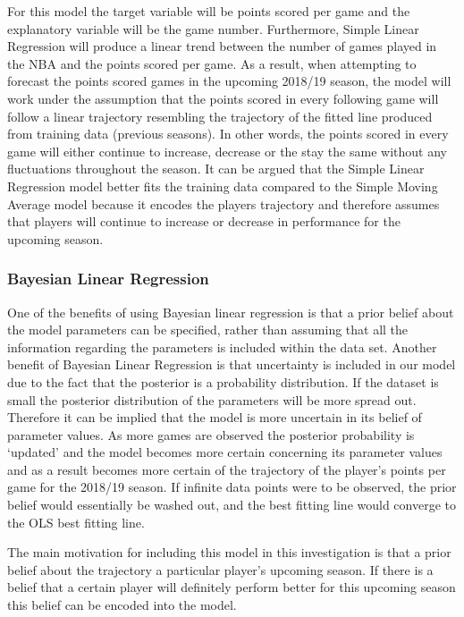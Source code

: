 \documentclass[a4paper,11pt,twoside]{article}
\begin{document}
For this model the target variable will be points scored per game and the explanatory variable will be the game number. Furthermore, Simple Linear Regression will produce a linear trend between the number of games played in the NBA and the points scored per game. As a result, when attempting to forecast the points scored games in the upcoming 2018/19 season, the model will work under the assumption that the points scored in every following game will follow a linear trajectory resembling the trajectory of the fitted line produced from training data (previous seasons). In other words, the points scored in every game will either continue to increase, decrease or the stay the same without any fluctuations throughout the season. It can be argued that the Simple Linear Regression model better fits the training data compared to the Simple Moving Average model because it encodes the players trajectory and therefore assumes that players will continue to increase or decrease in performance for the upcoming season.


\subsubsection{Bayesian Linear Regression}
One of the benefits of using Bayesian linear regression is that a prior belief about the model parameters can be specified, rather than assuming that all the information regarding the parameters is included within the data set. Another benefit of Bayesian Linear Regression is that uncertainty is included in our model due to the fact that the posterior is a probability distribution. If the dataset is small the posterior distribution of the parameters will be more spread out. Therefore it can be implied that the model is more uncertain in its belief of parameter values. As more games are observed the posterior probability is `updated' and the model becomes more certain concerning its parameter values and as a result becomes more certain of the trajectory of the player's points per game for the 2018/19 season. If infinite data points were to be observed, the prior belief would essentially be washed out, and the best fitting line would converge to the OLS best fitting line.

The main motivation for including this model in this investigation is that a prior belief about the trajectory a particular player's upcoming season. If there is a belief that a certain player will definitely perform better for this upcoming season this belief can be encoded into the model.
\end{document}

